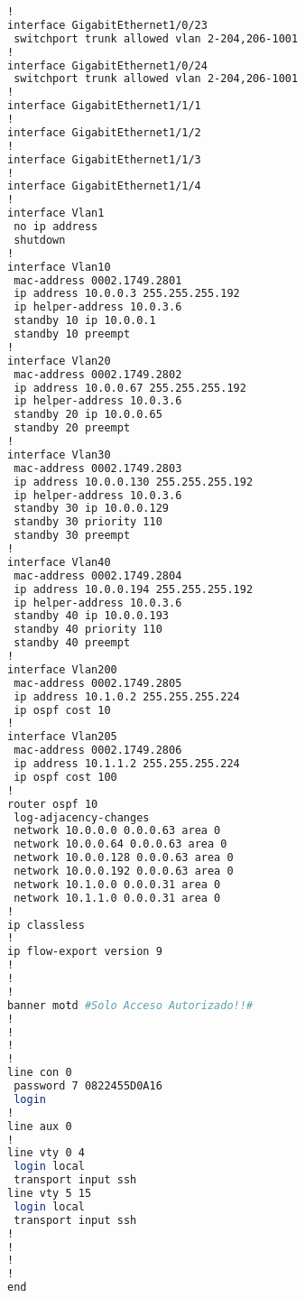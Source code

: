 \begin{lstlisting}[language=Bash, caption={Configuración Completa Switch Distribución 2}]
!
interface GigabitEthernet1/0/23
 switchport trunk allowed vlan 2-204,206-1001
!
interface GigabitEthernet1/0/24
 switchport trunk allowed vlan 2-204,206-1001
!
interface GigabitEthernet1/1/1
!
interface GigabitEthernet1/1/2
!
interface GigabitEthernet1/1/3
!
interface GigabitEthernet1/1/4
!
interface Vlan1
 no ip address
 shutdown
!
interface Vlan10
 mac-address 0002.1749.2801
 ip address 10.0.0.3 255.255.255.192
 ip helper-address 10.0.3.6
 standby 10 ip 10.0.0.1
 standby 10 preempt
!
interface Vlan20
 mac-address 0002.1749.2802
 ip address 10.0.0.67 255.255.255.192
 ip helper-address 10.0.3.6
 standby 20 ip 10.0.0.65
 standby 20 preempt
!
interface Vlan30
 mac-address 0002.1749.2803
 ip address 10.0.0.130 255.255.255.192
 ip helper-address 10.0.3.6
 standby 30 ip 10.0.0.129
 standby 30 priority 110
 standby 30 preempt
!
interface Vlan40
 mac-address 0002.1749.2804
 ip address 10.0.0.194 255.255.255.192
 ip helper-address 10.0.3.6
 standby 40 ip 10.0.0.193
 standby 40 priority 110
 standby 40 preempt
!
interface Vlan200
 mac-address 0002.1749.2805
 ip address 10.1.0.2 255.255.255.224
 ip ospf cost 10
!
interface Vlan205
 mac-address 0002.1749.2806
 ip address 10.1.1.2 255.255.255.224
 ip ospf cost 100
!
router ospf 10
 log-adjacency-changes
 network 10.0.0.0 0.0.0.63 area 0
 network 10.0.0.64 0.0.0.63 area 0
 network 10.0.0.128 0.0.0.63 area 0
 network 10.0.0.192 0.0.0.63 area 0
 network 10.1.0.0 0.0.0.31 area 0
 network 10.1.1.0 0.0.0.31 area 0
!
ip classless
!
ip flow-export version 9
!
!
!
banner motd #Solo Acceso Autorizado!!#
!
!
!
!
line con 0
 password 7 0822455D0A16
 login
!
line aux 0
!
line vty 0 4
 login local
 transport input ssh
line vty 5 15
 login local
 transport input ssh
!
!
!
!
end
\end{lstlisting}
